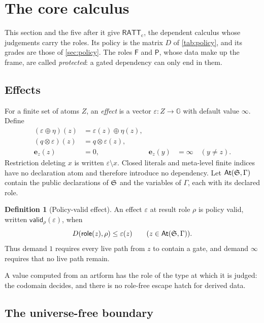 \documentclass[11pt]{article}
\numberwithin{equation}{section}
\theoremstyle{definition}
\newtheorem{definition}{Definition}[section]
\theoremstyle{plain}
\theoremstyle{remark}
\newcommand{\RATT}{\mathsf{RATT}_{\mathrm c}}
\newcommand{\Frm}{\mathsf F}
\newcommand{\Prs}{\mathsf P}
\newcommand{\Gd}{\mathbb G}
\newcommand{\eps}{\varepsilon}
\newcommand{\valid}{\mathsf{valid}}
\newcommand{\atoms}{\mathsf{At}}
\newcommand{\role}{\mathsf{role}}
\newcommand{\unit}{\mathbf e}
\newcommand{\absent}{\boldsymbol\infty}
\begin{document}
\section{The core calculus}\label{sec:core}

This section and the five after it give \(\RATT\), the dependent calculus
whose judgements carry the roles.  Its policy is the matrix \(D\) of
\cref{tab:policy}, and its grades are those of \cref{sec:policy}.  The roles
\(\Frm\) and \(\Prs\), whose data make up the frame, are called
\emph{protected}: a gated dependency can only end in them.

\subsection{Effects}\label{sec:effects}

For a finite set of atoms \(Z\), an \emph{effect} is a vector
\(
  \eps:Z\to\Gd
\)
with default value \(\absent\).  Define
\[
\begin{aligned}
 (\eps\oplus\eta)(z)&=\eps(z)\oplus\eta(z),\\
 (q\otimes\eps)(z)&=q\otimes\eps(z),\\
 \unit_z(z)&=0,
 &\unit_z(y)&=\absent\quad(y\ne z).
\end{aligned}
\]
Restriction deleting \(x\) is written \(\eps\setminus x\).  Closed literals and
meta-level finite indices have no declaration atom and therefore introduce no
dependency.  Let \(\atoms(\AFDeclSignature,\Gamma)\) contain the public declarations
of \({\mathfrak S}\) and the variables of \(\Gamma\), each with its declared role.

\begin{definition}[Policy-valid effect]\label{def:valid-effect}
An effect \(\eps\) at result role \(\rho\) is policy valid, written
\(\valid_\rho(\eps)\), when
\[
  D(\role(z),\rho)\le\eps(z)
  \qquad(z\in\atoms(\AFDeclSignature,\Gamma)).
\]
Thus demand \(1\) requires every live path from \(z\) to contain a gate, and
demand \(\absent\) requires that no live path remain.
\end{definition}

A value computed from an artform has the role of the type at which it is
judged: the codomain decides, and there is no role-free escape hatch for
derived data.

\subsection{The universe-free boundary}\label{sec:boundary}
\end{document}
